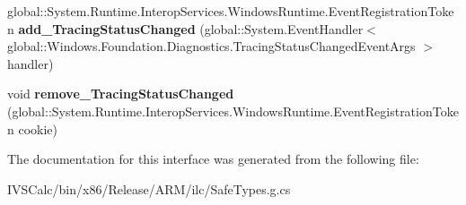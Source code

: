 \begin{DoxyCompactItemize}
\mbox{\label{interface_windows_1_1_foundation_1_1_diagnostics_1_1_i_async_causality_tracer_statics_adecd1f58d29fb341c2489d08610ac331}} 
global\+::\+System.\+Runtime.\+Interop\+Services.\+Windows\+Runtime.\+Event\+Registration\+Token {\bfseries add\+\_\+\+Tracing\+Status\+Changed} (global\+::\+System.\+Event\+Handler$<$ global\+::\+Windows.\+Foundation.\+Diagnostics.\+Tracing\+Status\+Changed\+Event\+Args $>$ handler)
\item 
\mbox{\label{interface_windows_1_1_foundation_1_1_diagnostics_1_1_i_async_causality_tracer_statics_a0b28a0699db651012d252a2063f84c0a}} 
void {\bfseries remove\+\_\+\+Tracing\+Status\+Changed} (global\+::\+System.\+Runtime.\+Interop\+Services.\+Windows\+Runtime.\+Event\+Registration\+Token cookie)
\end{DoxyCompactItemize}


The documentation for this interface was generated from the following file\+:\begin{DoxyCompactItemize}
\item 
I\+V\+S\+Calc/bin/x86/\+Release/\+A\+R\+M/ilc/Safe\+Types.\+g.\+cs\end{DoxyCompactItemize}
